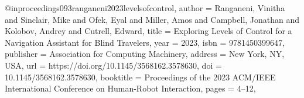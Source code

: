 @inproceedings{093ranganeni2023levelsofcontrol,
author = {Ranganeni, Vinitha and Sinclair, Mike and Ofek, Eyal and Miller, Amos and Campbell, Jonathan and Kolobov, Andrey and Cutrell, Edward},
title = {Exploring Levels of Control for a Navigation Assistant for Blind Travelers},
year = {2023},
isbn = {9781450399647},
publisher = {Association for Computing Machinery},
address = {New York, NY, USA},
url = {https://doi.org/10.1145/3568162.3578630},
doi = {10.1145/3568162.3578630},
booktitle = {Proceedings of the 2023 ACM/IEEE International Conference on Human-Robot Interaction},
pages = {4–12},
}